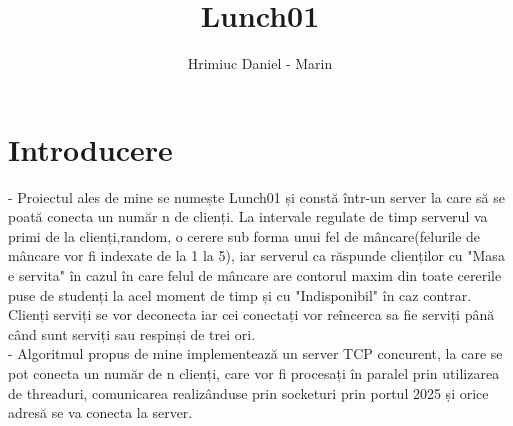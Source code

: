 \documentclass{llncs}
\title{Lunch01}
\author{Hrimiuc Daniel - Marin}
\begin{document}
\maketitle
\section{Introducere}
- Proiectul ales de mine se numește Lunch01 și constă într-un server la care să se poată conecta un număr n de clienți. La intervale regulate de timp serverul va primi de la clienți,random, o cerere sub forma unui fel de mâncare(felurile de mâncare vor fi indexate de la 1 la 5), iar serverul ca răspunde clienților cu "Masa e servita" în cazul în care felul de mâncare are contorul maxim din toate cererile puse de studenți la acel moment de timp și cu "Indisponibil" în caz contrar. Clienți serviți se vor deconecta iar cei conectați vor reîncerca sa fie serviți până când sunt serviți sau respinși de trei ori.\\
- Algoritmul propus de mine implementează un server TCP concurent, la care se pot conecta un număr de n clienți, care vor fi procesați în paralel prin utilizarea de threaduri, comunicarea realizânduse prin socketuri prin portul 2025 și orice adresă se va conecta la server.
\end{document}
